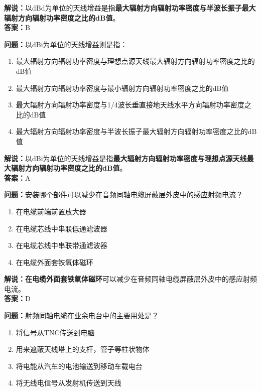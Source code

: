 \textbf{解说：}以dBd为单位的天线增益是指\textbf{最大辐射方向辐射功率密度与半波长振子最大辐射方向辐射功率密度之比的dB值}。\\\textbf{答案：}B



\textbf{问题：}以dBi为单位的天线增益则是指：
\begin{enumerate}[label=\Alph*), leftmargin=1.5cm]
	\item 最大辐射方向辐射功率密度与理想点源天线最大辐射方向辐射功率密度之比的dB值
	\item 最大辐射方向辐射功率密度与最小辐射方向辐射功率密度之比的dB值
	\item 最大辐射方向辐射功率密度与1/4波长垂直接地天线水平方向辐射功率密度之比的dB值
	\item 最大辐射方向辐射功率密度与半波长振子最大辐射方向辐射功率密度之比的dB值
\end{enumerate}

\textbf{解说：}以dBi为单位的天线增益是指\textbf{最大辐射方向辐射功率密度与理想点源天线最大辐射方向辐射功率密度之比的dB值}。\\\textbf{答案：}A



\textbf{问题：}安装哪个部件可以减少在音频同轴电缆屏蔽层外皮中的感应射频电流？

\begin{enumerate}[label=\Alph*), leftmargin=1.5cm]
	\item 在电缆前端前置放大器
	\item 在电缆芯线中串联低通滤波器
	\item 在电缆芯线中串联带通滤波器	
	\item 在电缆外面套铁氧体磁环
\end{enumerate}

\textbf{解说：}\textbf{在电缆外面套铁氧体磁环}可以减少在音频同轴电缆屏蔽层外皮中的感应射频电流。\\\textbf{答案：}D



\textbf{问题：}射频同轴电缆在业余电台中的主要用处是？

\begin{enumerate}[label=\Alph*), leftmargin=1.5cm]
	\item 将信号从TNC传送到电脑
	\item 用来遮蔽天线塔上的支杆，管子等柱状物体
	\item 将电能从汽车的电池输送到移动车载电台
	\item 将无线电信号从发射机传送到天线
\end{enumerate}

